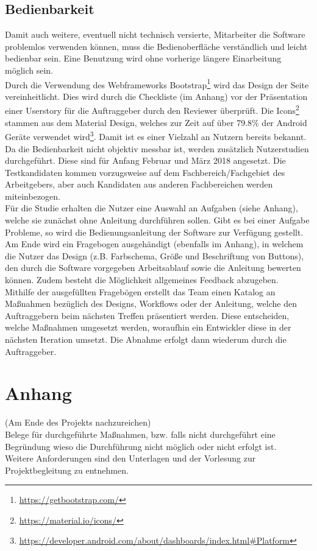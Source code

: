 \documentclass[accentcolor=tud9c,12pt,paper=a4]{tudreport}
\begin{document}
		\section{Bedienbarkeit}
		Damit auch weitere, eventuell nicht technisch versierte, Mitarbeiter die Software
		problemlos verwenden können, muss die 
		Bedienoberfläche verständlich und leicht bedienbar sein. Eine Benutzung wird ohne
		vorherige längere Einarbeitung möglich sein.
		\\[5pt]
		Durch die Verwendung des Webframeworks Bootstrap\footnote{\url{https://getbootstrap.com/}}
		wird das Design der Seite vereinheitlicht. Dies wird durch die Checkliste (im Anhang)
		vor der Präsentation einer Userstory für die Auftraggeber durch den Reviewer überprüft. 
		Die Icons\footnote{\url{https://material.io/icons/}}
		stammen aus dem Material Design, welches zur Zeit auf über 79.8\% der Android Geräte
		verwendet wird\footnote{\url{https://developer.android.com/about/dashboards/index.html#Platform}}. 
		Damit ist es einer Vielzahl an Nutzern bereits bekannt.
		\\[5pt]
		Da die Bedienbarkeit nicht objektiv messbar ist, werden zusätzlich Nutzerstudien durchgeführt.
		Diese sind für Anfang Februar und März 2018 angesetzt.
		Die Testkandidaten kommen vorzugsweise auf dem
		Fachbereich/Fachgebiet des Arbeitgebers, aber auch Kandidaten aus anderen
		Fachbereichen werden miteinbezogen.
		\\[5pt]
		Für die Studie erhalten die Nutzer eine Auswahl an Aufgaben (siehe Anhang), 
		welche sie zunächst ohne Anleitung durchführen sollen. 
		Gibt es bei einer Aufgabe Probleme, so wird die Bedienungsanleitung 
		der Software zur Verfügung gestellt.
		Am Ende wird ein Fragebogen ausgehändigt (ebenfalls im Anhang),
		in welchem die Nutzer das Design (z.B. Farbschema, Größe und Beschriftung von Buttons), den
		durch die Software vorgegeben Arbeitsablauf sowie die Anleitung bewerten können. Zudem
		besteht die Möglichkeit allgemeines Feedback abzugeben.
		\\[5pt]
		Mithilfe der ausgefüllten Fragebögen erstellt das Team einen Katalog an
		Maßnahmen bezüglich des Designs, Workflows oder der Anleitung, 
		welche den Auftraggebern beim nächsten Treffen präsentiert werden. 
		Diese entscheiden, welche Maßnahmen umgesetzt werden, woraufhin ein
		Entwickler diese in der nächsten Iteration umsetzt. Die Abnahme erfolgt dann
		wiederum durch die Auftraggeber.

\appendix
	\chapter{Anhang}
		(Am Ende des Projekts nachzureichen)\\
		Belege für durchgeführte Maßnahmen, bzw. falls nicht durchgeführt eine Begründung 
		wieso die Durchführung nicht möglich oder nicht erfolgt ist. \\
		Weitere Anforderungen sind den Unterlagen und der Vorlesung zur Projektbegleitung 
		zu entnehmen.
\end{document}
